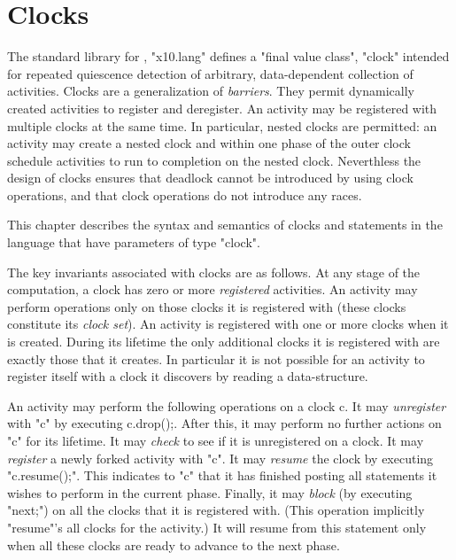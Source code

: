 \chapter{Clocks}\label{XtenClocks}

The standard library for \Xten{}, \xcd"x10.lang" defines a \xcd"final value class", \xcd"clock" intended for repeated quiescence detection
of arbitrary, data-dependent collection of activities. Clocks are a
generalization of {\em barriers}. They permit dynamically created
activities to register and deregister. An activity may be registered
with multiple clocks at the same time. In particular, nested clocks
are permitted: an activity may create a nested clock and within one
phase of the outer clock schedule activities to run to completion on
the nested clock.  Neverthless the design of clocks ensures that
deadlock cannot be introduced by using clock operations, and that
clock operations do not introduce any races.

This chapter describes the syntax and semantics of clocks and
statements in the language that have parameters of type \xcd"clock". 

The key invariants associated with clocks are as follows.  At any
stage of the computation, a clock has zero or more {\em registered}
activities. An activity may perform operations only on those clocks it
is registered with (these clocks constitute its {\em clock set}).  An
activity is registered with one or more clocks when it is created.
During its lifetime the only additional clocks it is registered with
are exactly those that it creates. In particular it is not possible
for an activity to register itself with a clock it discovers by
reading a data-structure.

An activity may perform the following operations on a clock {\cf
c}. It may {\em unregister} with \xcd"c" by executing {\cf
c.drop();}. After this, it may perform no further actions on \xcd"c"
for its lifetime. It may {\em check} to see if it is unregistered on a
clock. It may {\em register} a newly forked activity with \xcd"c".
It may {\em resume} the clock by executing \xcd"c.resume();". This
indicates to \xcd"c" that it has finished posting all statements it
wishes to perform in the current phase. Finally, it may {\em block}
(by executing \xcd"next;") on all the clocks that it is registered
with. (This operation implicitly \xcd"resume"'s all clocks for the
activity.) It will resume from this statement only when all these
clocks are ready to advance to the next phase.

